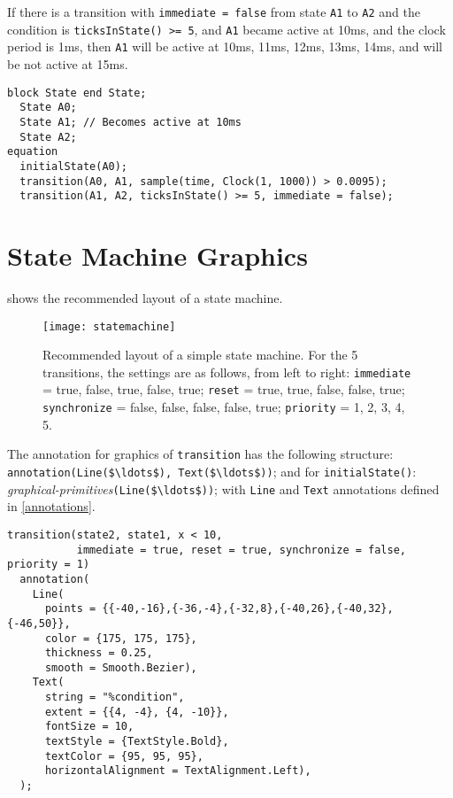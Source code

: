 \begin{example}
If there is a transition with \lstinline!immediate = false! from state \lstinline!A1! to \lstinline!A2! and the condition is \lstinline!ticksInState() >= 5!, and \lstinline!A1! became active at 10ms, and the clock period is 1ms, then \lstinline!A1! will be active at 10ms, 11ms, 12ms, 13ms, 14ms, and will be not active at 15ms.
\begin{lstlisting}[language=modelica]
  block State end State;
  State A0;
  State A1; // Becomes active at 10ms
  State A2;
equation
  initialState(A0);
  transition(A0, A1, sample(time, Clock(1, 1000)) > 0.0095);
  transition(A1, A2, ticksInState() >= 5, immediate = false);
\end{lstlisting}
\end{example}

\section{State Machine Graphics}\label{state-machine-graphics}

\begin{nonnormative}
 shows the recommended layout of a state machine.
\end{nonnormative}

\begin{figure}[H]
  \begin{center}
    \texttt{[image: statemachine]}
  \end{center}
  \caption{
    Recommended layout of a simple state machine.
    For the 5 transitions, the settings are as follows, from left to right: \lstinline!immediate! = true, false, true, false, true; \lstinline!reset! = true, true, false, false, true; \lstinline!synchronize! = false, false, false, false, true; \lstinline!priority! = 1, 2, 3, 4, 5.
  }
  \label{fig:state-machine-layout}
\end{figure}

The annotation for graphics of \lstinline!transition! has the following structure: \lstinline!annotation(Line($\ldots$), Text($\ldots$))!; and for \lstinline!initialState()!: \emph{graphical-primitives}\lstinline!(Line($\ldots$))!; with \lstinline!Line! and \lstinline!Text! annotations defined in \cref{annotations}.

\begin{example}
\begin{lstlisting}[language=modelica]
transition(state2, state1, x < 10,
           immediate = true, reset = true, synchronize = false, priority = 1)
  annotation(
    Line(
      points = {{-40,-16},{-36,-4},{-32,8},{-40,26},{-40,32},{-46,50}},
      color = {175, 175, 175},
      thickness = 0.25,
      smooth = Smooth.Bezier),
    Text(
      string = "%condition",
      extent = {{4, -4}, {4, -10}},
      fontSize = 10,
      textStyle = {TextStyle.Bold},
      textColor = {95, 95, 95},
      horizontalAlignment = TextAlignment.Left),
  );
\end{lstlisting}
\end{example}

